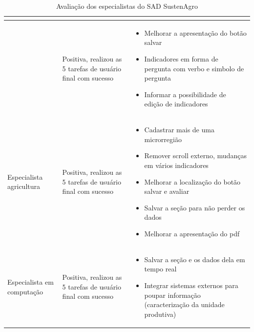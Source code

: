 \begin{table}
\begin{tabular}{|>{\centering}p{2.5cm}|>{\centering}p{2.5cm}|>{\centering}p{10cm}|}
\begin{itemize}
\end{itemize}
\tabularnewline
\hline 
{\small{}Especialista em ontologias} & {\small{}Positiva, realizou as 5 tarefas de usuário final com sucesso} & \begin{itemize}
\item {\small{}Melhorar a apresentação do botão salvar}{\small \par}
\item {\small{}Indicadores em forma de pergunta com verbo e simbolo de pergunta}{\small \par}
\item {\small{}Informar a possibilidade de edição de indicadores }
\end{itemize}
\tabularnewline
\hline 
{\small{}Especialista agricultura} & {\small{}Positiva, realizou as 5 tarefas de usuário final com sucesso} & \begin{itemize}
\item {\small{}Cadastrar mais de uma microrregião}{\small \par}
\item {\small{}Remover }\foreignlanguage{english}{{\small{}scroll}}{\small{}
externo, mudanças em vários indicadores}{\small \par}
\item {\small{}Melhorar a localização do botão salvar e avaliar}{\small \par}
\item {\small{}Salvar a seção para não perder os dados}{\small \par}
\item {\small{}Melhorar a apresentação do pdf}
\end{itemize}
\tabularnewline
\hline 
{\small{}Especialista em computação} & {\small{}Positiva, realizou as 5 tarefas de usuário final com sucesso} & \begin{itemize}
\item {\small{}Salvar a seção e os dados dela em tempo real}{\small \par}
\item {\small{}Integrar sistemas externos para poupar informação (caracterização
da unidade produtiva) }
\end{itemize}
\tabularnewline
\hline 
\end{tabular}\caption{Avaliação dos especialistas do SAD SustenAgro}
\end{table}

